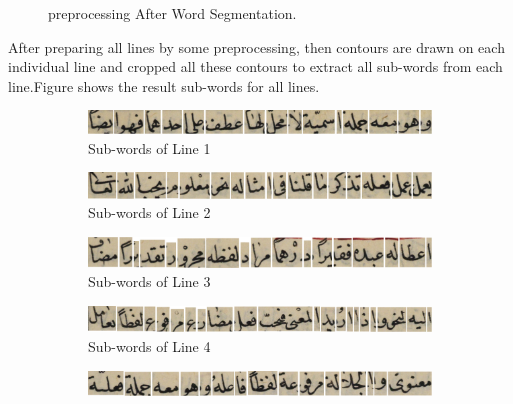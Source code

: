 \begin{figure}[H]
        \caption{preprocessing After Word Segmentation.}
        \label{fig:pre-word_segmentation}
\end{figure}

After preparing all lines by some preprocessing, then contours are drawn on each individual line and cropped all these contours to extract all sub-words from each line.Figure  shows the result sub-words for all lines.
\begin{figure}[H]
     \centering%
     \begin{subfigure}[b]{0.3\textwidth}
         \centering
         \includegraphics[width=\textwidth]{images/word-seg/line-1.png}
         \caption{Sub-words of Line 1}
     \end{subfigure}
     \centering%
     \begin{subfigure}[b]{0.3\textwidth}
         \centering
         \includegraphics[width=\textwidth]{images/word-seg/line-2.png}
         \caption{Sub-words of Line 2}
     \end{subfigure}
     \centering%
     \begin{subfigure}[b]{0.3\textwidth}
         \centering
         \includegraphics[width=\textwidth]{images/word-seg/line-3.png}
         \caption{Sub-words of Line 3}
     \end{subfigure}
     \centering%
     \begin{subfigure}[b]{0.3\textwidth}
         \centering
         \includegraphics[width=\textwidth]{images/word-seg/line-4.png}
         \caption{Sub-words of Line 4}
     \end{subfigure}
     \centering%
     \begin{subfigure}[b]{0.3\textwidth}
         \centering
         \includegraphics[width=\textwidth]{images/word-seg/line-5.png}

\end{subfigure}
\end{figure}

